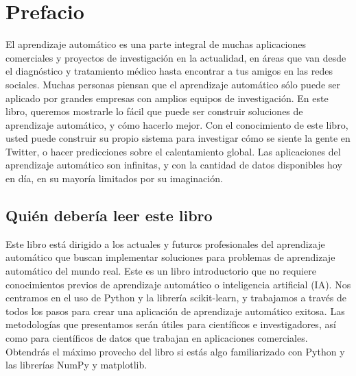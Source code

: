    \listoftables
	\newpage
	
	
	
	
	
	
	
	\chapter*{Prefacio}	



El aprendizaje automático es una parte integral de muchas aplicaciones comerciales y proyectos de investigación en la actualidad, en áreas que van desde el diagnóstico y tratamiento médico hasta encontrar a tus amigos en las redes sociales. Muchas personas piensan que el aprendizaje automático sólo puede ser aplicado por grandes empresas con amplios equipos de investigación. En este libro, queremos mostrarle lo fácil que puede ser construir soluciones de aprendizaje automático, y cómo hacerlo mejor. Con el conocimiento de este libro, usted puede construir su propio sistema para investigar cómo se siente la gente en Twitter, o hacer predicciones sobre el calentamiento global. Las aplicaciones del aprendizaje automático son infinitas,  y  con la cantidad de datos disponibles hoy en día, en su mayoría limitados por su imaginación.




\section*{Quién debería leer este libro}

Este libro está dirigido a los actuales y futuros profesionales del aprendizaje automático que buscan
implementar soluciones para problemas de aprendizaje automático del mundo real.
Este es un libro introductorio que no requiere conocimientos previos de aprendizaje automático o inteligencia artificial (IA). Nos centramos en el uso de Python y la librería {\ttfamily scikit-learn}, y trabajamos a través de todos los pasos para crear una aplicación de aprendizaje automático exitosa. Las metodologías que presentamos serán útiles para científicos e investigadores, así como para científicos de datos que trabajan en aplicaciones comerciales. Obtendrás el máximo provecho del libro si estás algo familiarizado con Python y las librerías {\ttfamily  NumPy} y  {\ttfamily matplotlib}.\\



